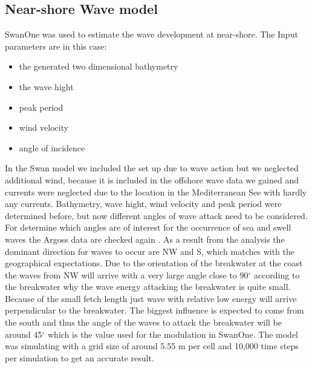 \subsection{Near-shore Wave model}
SwanOne was used to estimate the wave development at near-shore. The Input parameters are in this case:
\begin{itemize}
\item the generated two dimensional bathymetry
\item the wave hight
\item peak period
\item wind velocity
\item angle of incidence 	
\end{itemize}
In the Swan model we included the set up due to wave action but we neglected additional wind, because it is included in the offshore wave data we gained and currents were neglected due to the location in the Mediterranean See with hardly any currents.
Bathymetry, wave hight, wind velocity and peak period were determined before, but now different angles of wave attack need to be considered.
For determine which angles are of interest for the occurrence of sea and swell waves the Argoss data are checked again 
. As a result from the analysis the dominant direction for waves to occur are NW and S, which matches with the geographical expectations. Due to the orientation of the breakwater at the coast the waves from NW will arrive with a very large angle close to 90$^\circ$ according to the breakwater why the wave energy attacking the breakwater is quite small. Because of the small fetch length just wave with relative low energy will arrive perpendicular to the breakwater. The biggest influence is expected to come from the south and thus the angle of the waves to attack the breakwater will be around 45$^\circ$ which is the value used for the modulation in SwanOne. The model was simulating with a grid size of around 5.55 m per cell and 10,000 time steps per simulation to get an accurate result.

